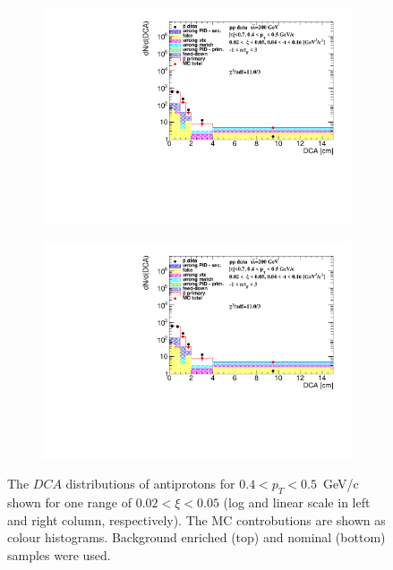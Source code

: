 \begin{figure}[htpb]
\begin{subfigure}{.47\textwidth}
		\includegraphics[width=\linewidth, page=3]{chapters/chrgSTAR/img/DCAproton/background_p_bar_0.pdf}
	\end{subfigure}
	\begin{subfigure}{.47\textwidth}
		\includegraphics[width=\linewidth, page=4]{chapters/chrgSTAR/img/DCAproton/background_p_bar_0.pdf}
	\end{subfigure}
	\caption[The $DCA$ distributions of antiprotons for $0.4<p_T<0.5$~GeV/c shown for one range of $0.02<\xi<0.05$]{The $DCA$ distributions of antiprotons for $0.4<p_T<0.5$~GeV/c shown for one range of $0.02<\xi<0.05$ (log and linear scale in left and right column, respectively). The MC controbutions are shown as colour histograms. Background enriched (top) and  nominal (bottom) samples were used.}
	\label{fig:bkg_proton_bar}
\end{figure}


